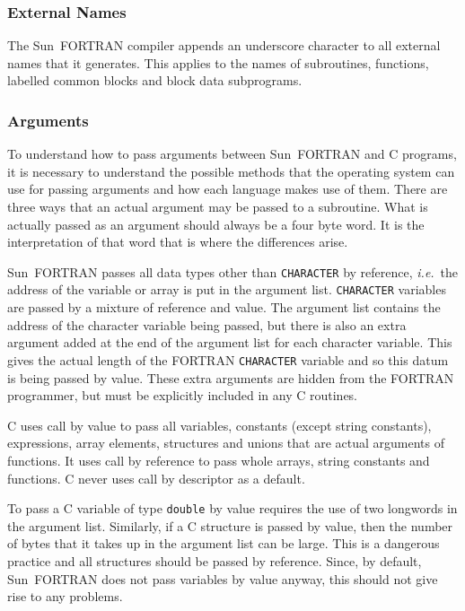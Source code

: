 \documentclass[twoside,11pt]{article}
\renewcommand{\_}{\texttt{\symbol{95}}}
\begin{document}
\subsubsection{External Names}

The Sun~FORTRAN compiler appends an underscore character to all external names
that it generates. 
This applies to the names of subroutines, functions, labelled common blocks 
and block data subprograms.

\subsubsection{\label{sun_arg}Arguments}

To understand how to pass arguments between Sun~FORTRAN and C programs, it is
necessary to understand the possible methods that the operating system can use
for passing arguments and how each language makes use of them. There are three
ways that an actual argument may be passed to a subroutine. What is actually
passed as an argument should always be a four byte word. It is the
interpretation of that word that is where the differences arise. 

Sun~FORTRAN passes all data types other than \texttt{CHARACTER} by reference,
\textit{i.e.}\ the address of the variable or array is put in the argument list.
\texttt{CHARACTER} variables are passed by  a mixture of reference and value. 
The argument list contains the address of the character variable being passed,
but there is also an extra argument added at the end of the argument list for
each character variable. 
This gives the actual length of the FORTRAN \texttt{CHARACTER} variable and so
this datum is being passed by value. These extra arguments are hidden from the
FORTRAN programmer, but must be explicitly included in any C routines.

C uses call by value to pass all variables, constants (except string
constants), expressions, array elements, structures and unions that are actual
arguments of functions. It uses call by reference to pass whole arrays, string
constants and functions. C never uses call by descriptor as a default.

To pass a C variable of type \texttt{double} by value requires the use of two
longwords in the argument list. Similarly, if a C structure is passed by value,
then the number of bytes that it takes up in the argument list can be large.
This is a dangerous practice and all structures should be passed by reference.
Since, by default, Sun~FORTRAN does not pass variables by value anyway, this 
should not give rise to any problems.
\end{document}
